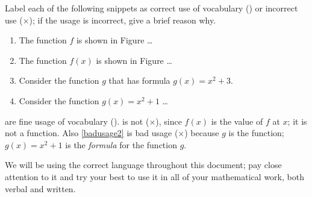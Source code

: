 \begin{pccexample}
Label each of the following snippets as correct use of vocabulary ({\color{green}\checkmark}) or  incorrect use ({\color{red}$\times$});
if the usage is incorrect, give a brief reason why.
\begin{enumerate}
	\item The function $f$ is shown in Figure \ldots\label{fineusage1}
	\item The function $f(x)$ is shown in Figure \ldots\label{badusage1}
	\item Consider the function $g$ that has formula $g(x)=x^2+3$.\label{fineusage2}
	\item Consider the function $g(x)=x^2+1$ \ldots\label{badusage2}
\end{enumerate}
\begin{pccsolution}
  are fine usage of vocabulary ({\color{green}\checkmark}).  is not ({\color{red}$\times$}), since $f(x)$ is the value of $f$ at $x$; it is not a function. Also \cref{badusage2} is bad usage ({\color{red}$\times$}) because $g$ is the function; $g(x)=x^2+1$ is the \emph{formula} for the function $g$.
\end{pccsolution}

We will be using the correct language throughout this document; pay close
attention to it and try your best to use it in all of your mathematical 
work, both verbal and written.
\end{pccexample}

